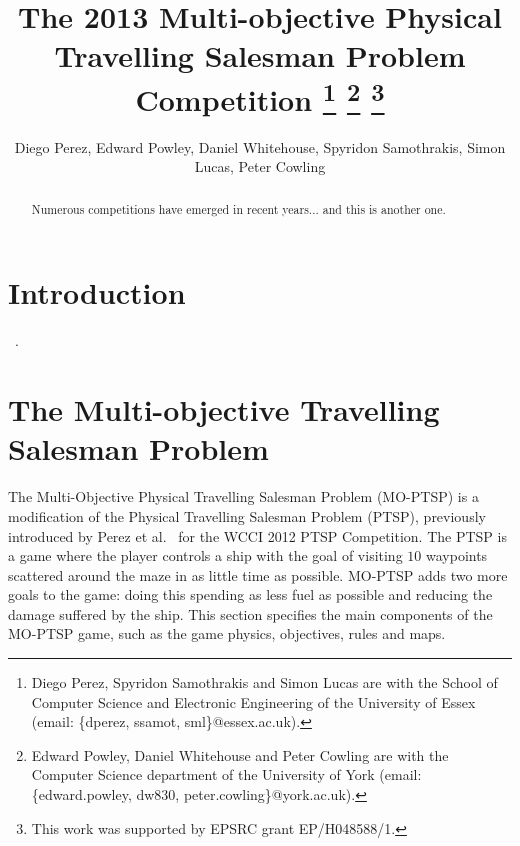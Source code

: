 \documentclass[conference]{IEEEtran}
\begin{document}
\title{The 2013 Multi-objective Physical Travelling Salesman Problem Competition \thanks{Diego Perez, Spyridon Samothrakis and Simon Lucas are with the School of Computer Science and Electronic Engineering of the University of Essex (email: \{dperez, ssamot, sml\}@essex.ac.uk).} \thanks{Edward Powley, Daniel Whitehouse and Peter Cowling are with the Computer Science department of the University of York (email:  \{edward.powley, dw830, peter.cowling\}@york.ac.uk).} \thanks{This work was supported by EPSRC grant EP/H048588/1.}}

\author{Diego Perez, Edward Powley, Daniel Whitehouse, Spyridon Samothrakis, Simon Lucas, Peter Cowling}


\maketitle

\begin{abstract}
Numerous competitions have emerged in recent years... and this is another one.
\end{abstract}


\section{Introduction}

~\cite{PerezCEC2012,MCTSSurvey}.

\section{The Multi-objective Travelling Salesman Problem}


The Multi-Objective Physical Travelling Salesman Problem (MO-PTSP) is a modification of the Physical Travelling Salesman Problem (PTSP), previously introduced by Perez et al.~\cite{PerezCEC2012} for the WCCI 2012 PTSP Competition. The PTSP is a game where the player controls a ship with the goal of visiting $10$ waypoints scattered around the maze in as little time as possible. MO-PTSP adds two more goals to the game: doing this spending as less fuel as possible and reducing the damage suffered by the ship. This section specifies the main components of the MO-PTSP game, such as the game physics, objectives, rules and maps. 
\end{document}
